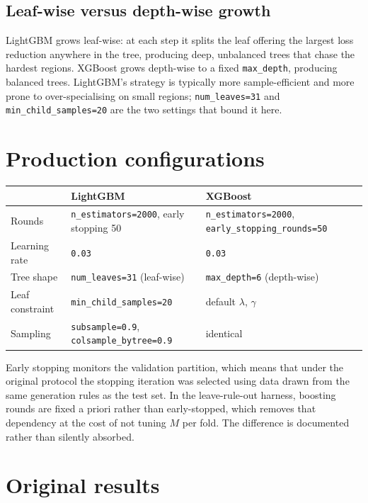 \subsection{Leaf-wise versus depth-wise growth}

LightGBM grows leaf-wise: at each step it splits the leaf offering the
largest loss reduction anywhere in the tree, producing deep, unbalanced
trees that chase the hardest regions. XGBoost grows depth-wise to a fixed
\texttt{max\_depth}, producing balanced trees. LightGBM's strategy is
typically more sample-efficient and more prone to over-specialising on
small regions; \texttt{num\_leaves=31} and
\texttt{min\_child\_samples=20} are the two settings that bound it here.

\section{Production configurations}

\begin{center}\small
\begin{tabular}{lp{5.3cm}p{5.3cm}}
\toprule
& LightGBM & XGBoost \\
\midrule
Rounds & \texttt{n\_estimators=2000}, early stopping 50 &
\texttt{n\_estimators=2000}, \texttt{early\_stopping\_rounds=50} \\
Learning rate & \texttt{0.03} & \texttt{0.03} \\
Tree shape & \texttt{num\_leaves=31} (leaf-wise) & \texttt{max\_depth=6} (depth-wise) \\
Leaf constraint & \texttt{min\_child\_samples=20} & default $\lambda$, $\gamma$ \\
Sampling & \texttt{subsample=0.9}, \texttt{colsample\_bytree=0.9} & identical \\
\bottomrule
\end{tabular}
\end{center}

Early stopping monitors the validation partition, which means that under
the original protocol the stopping iteration was selected using data drawn
from the same generation rules as the test set. In the leave-rule-out
harness, boosting rounds are fixed a priori rather than early-stopped,
which removes that dependency at the cost of not tuning $M$ per fold. The
difference is documented rather than silently absorbed.

\section{Original results}

